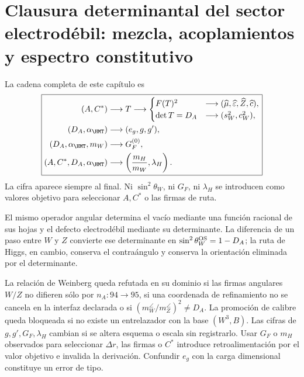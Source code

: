 \section{Clausura determinantal del sector electrodébil: mezcla, acoplamientos y espectro constitutivo}

La cadena completa de este cap\'itulo es
\begin{equation}
\label{eq:ew-causal-diagram}
\boxed{
\begin{aligned}
(A,C^*)&\longrightarrow T
\longrightarrow
\begin{cases}
F(T)^2&\longrightarrow
(\widehat\mu,\widehat\varepsilon,\widehat Z,\widehat c),\\
\det T=D_A&\longrightarrow
(s_W^2,c_W^2),
\end{cases}\\
(D_A,\alpha_{\HMT})&\longrightarrow(e_g,g,g'),\\
(D_A,\alpha_{\HMT},m_W)&\longrightarrow G_F^{(0)},\\
(A,C^*,D_A,\alpha_{\HMT})&\longrightarrow
\left(\frac{m_H}{m_W},\lambda_H\right).
\end{aligned}}
\end{equation}
La cifra aparece siempre al final. Ni \(\sin^2\theta_W\), ni
\(G_F\), ni \(\lambda_H\) se introducen como valores objetivo para seleccionar
\(A,C^*\) o las firmas de ruta.

\begin{proposition}
El mismo operador angular determina el vac\'io mediante una funci\'on racional
de sus hojas y el defecto electrod\'ebil mediante su determinante. La
diferencia de un paso entre \(W\) y \(Z\) convierte ese determinante en
\(\sin^2\theta_W^{\rm OS}=1-D_A\); la ruta de Higgs, en cambio, conserva
el contra\'angulo y conserva la orientaci\'on eliminada por el determinante.
\end{proposition}

\begin{remark}
La relaci\'on de Weinberg queda refutada en su dominio si las firmas
angulares \(W/Z\) no difieren s\'olo por \(n_A:94\to95\), si una coordenada
de refinamiento no se cancela en la interfaz declarada o si
\((m_W^{\angle}/m_Z^{\angle})^2\neq D_A\). La promoci\'on de calibre queda
bloqueada si no existe un entrelazador con la base \((W^3,B)\). Las cifras
de \(g,g',G_F,\lambda_H\) cambian si se altera esquema o escala sin
registrarlo. Usar \(G_F\) o \(m_H\) observados para seleccionar
\(\Delta r\), las firmas o \(C^*\) introduce retroalimentaci\'on por el
valor objetivo e invalida la derivaci\'on. Confundir \(e_g\) con la carga
dimensional constituye un error de tipo.
\end{remark}

